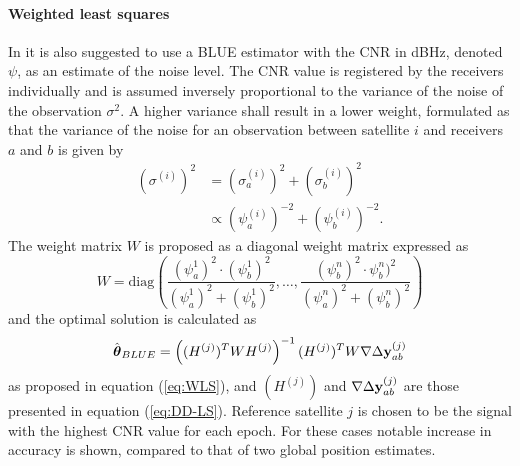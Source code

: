 \paragraph{Weighted least squares}
In \cite{BLUE} it is also suggested to use a BLUE estimator with the CNR in dBHz, denoted $\psi$, as an estimate of the noise level. The CNR value is registered by the receivers individually and is assumed inversely proportional to the variance of the noise of the observation $\sigma^2$. A higher variance shall result in a lower weight, formulated as that the variance of the noise for an observation between satellite $i$ and receivers $a$ and $b$ is given by
\begin{align*}
(\sigma^{(i)})^2&=(\sigma^{(i)}_a)^2+(\sigma^{(i)}_b)^2\\
		&\propto (\psi^{(i)}_a)^{-2}+(\psi^{(i)}_b)^{-2}.
\end{align*} 
The weight matrix $W$ is proposed as a diagonal weight matrix expressed as
\begin{equation}
W=\text{diag}\left(\frac{(\psi^1_a)^2\cdot(\psi^1_b)^2}{(\psi^1_a)^2+(\psi^1_b)^2},\dots,\frac{(\psi^n_b)^2\cdot \psi^n_b)^2}{(\psi^n_a)^2+(\psi^n_b)^2}\right)
\end{equation}
and the optimal solution is calculated as 
\begin{align*}
\hat{\boldsymbol \theta}_{BLUE}=\left((H^{(j)})^TWH^{(j)}\right)^{-1}(H^{(j)})^TW\nabla \Delta {\bf y}^{(j)}_{ab}
\end{align*} 
as proposed in equation (\ref{eq:WLS}), and $(H^{(j)})$ and $\nabla \Delta {\bf y}^{(j)}_{ab}$ are those presented in equation (\ref{eq:DD-LS}). Reference satellite $j$ is chosen to be the signal with the highest CNR value for each epoch. For these cases notable increase in accuracy is shown, compared to that of two global position estimates. 
